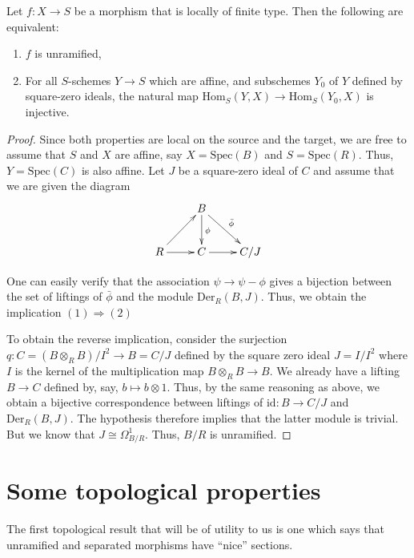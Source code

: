 \begin{theorem}
\label{theorem-formally-unramified}
Let $f:X \to S$ be a morphism that is locally of finite type. Then the
following are equivalent:
\begin{enumerate}
\item $f$ is unramified,
\item For all $S$-schemes $Y \to S$ which are affine, and subschemes $Y_0$ of
$Y$ defined by square-zero ideals, the natural map
$\text{Hom}_S(Y,X) \to \text{Hom}_S(Y_0,X)$ is injective.
\end{enumerate}
\end{theorem}

\begin{proof}
Since both properties are local on the source and the target, we are free to
assume that $S$ and $X$ are affine, say $X = \text{Spec}(B)$ and $S = 
\text{Spec}(R)$.
Thus, $Y = \text{Spec}(C)$ is also affine. Let $J$ be a square-zero ideal of 
$C$ and
assume that we are given the diagram
$$
\xymatrix{
					& B \ar[d]^\phi \ar[rd]^{\bar{\phi}}	
& \\
R \ar[r] \ar[ur]	& C \ar[r]						
		& C/J
}
$$

\medskip\noindent
One can easily verify that the association $\psi \to \psi - \phi$ gives a
bijection between the set of liftings of $\bar{\phi}$ and the module
$\text{Der}_R(B,J)$. Thus, we obtain the implication $(1) \Rightarrow (2)$

\medskip\noindent
To obtain the reverse implication, consider the surjection
$q:C = (B \otimes_R B)/I^2 \to B = C/J$ defined by the square zero ideal
$J = I/I^2$ where $I$ is the kernel of the multiplication map
$B \otimes_R B \to B$. We already have a lifting $B \to C$ defined by, say,
$b \mapsto b \otimes 1$. Thus, by the same reasoning as above, we obtain a
bijective correspondence between liftings of $\mathrm{id}:B \to C/J$ and
$\text{Der}_R(B,J)$. The hypothesis therefore implies that the latter module is
trivial. But we know that $J \cong \Omega^1_{B/R}$. Thus, $B/R$ is unramified.
\end{proof}

\section{Some topological properties}
\label{section-topological-unramified}

\noindent
The first topological result that will be of utility to us is one which says
that unramified and separated morphisms have ``nice'' sections.

